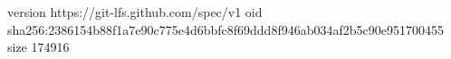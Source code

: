 version https://git-lfs.github.com/spec/v1
oid sha256:2386154b88f1a7e90c775e4d6bbfc8f69ddd8f946ab034af2b5c90e951700455
size 174916
